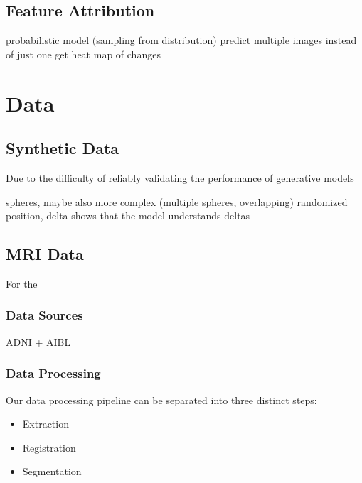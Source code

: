 \section{Feature Attribution}
probabilistic model (sampling from distribution)
predict multiple images instead of just one
get heat map of changes

\chapter{Data}

\section{Synthetic Data}
Due to the difficulty of reliably validating the performance of generative models

spheres, maybe also more complex (multiple spheres, overlapping)
randomized position, delta
shows that the model understands deltas

\section{MRI Data}
For the 

\subsection{Data Sources}

ADNI + AIBL

\subsection{Data Processing}
Our data processing pipeline can be separated into three distinct steps:

\begin{itemize}
\item Extraction
\item Registration
\item Segmentation
\end{itemize}

